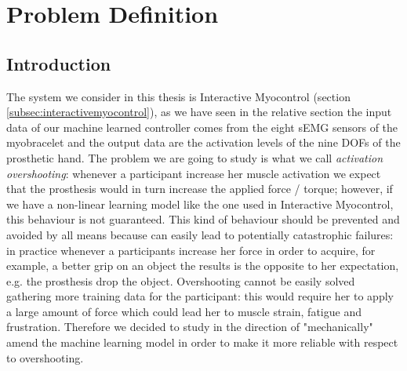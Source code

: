 \chapter{Problem Definition}\label{ch:problem-definition}
\section{Introduction}\label{sec:pd-intro}
The system we consider in this thesis is Interactive Myocontrol (section \ref{subsec:interactivemyocontrol}), as we have seen in the relative section the input data of our machine learned controller comes from the eight sEMG sensors of the myobracelet and the output data are the activation levels of the nine DOFs of the prosthetic hand.
The problem we are going to study is what we call \textit{activation overshooting}: whenever a participant increase her muscle activation we expect that the prosthesis would in turn increase the applied force / torque; however, if we have a non-linear learning model like the one used in Interactive Myocontrol, this behaviour is not guaranteed. This kind of behaviour should be prevented and avoided by all means because can easily lead to potentially catastrophic failures: in practice whenever a participants increase her force in order to acquire, for example, a better grip on an object the results is the opposite to her expectation, e.g. the prosthesis drop the object.
Overshooting cannot be easily solved gathering more training data for the participant: this would require her to apply a large amount of force which could lead her to muscle strain, fatigue and frustration. Therefore we decided to study in the direction of "mechanically" amend the machine learning model in order to make it more reliable with respect to overshooting.
%
%
%
